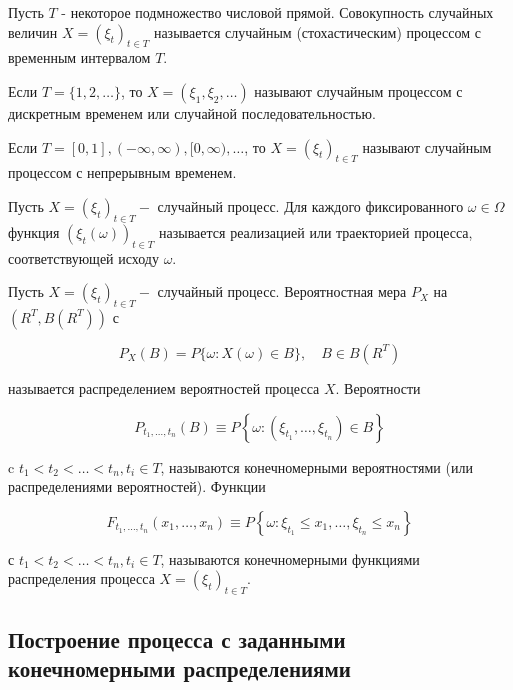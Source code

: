\begin{definition}\label{def_3_par_5}
 Пусть $T$ - некоторое подмножество числовой прямой. Совокупность случайных величин $X=\left(\xi_{t}\right)_{t \in T}$ называется случайным (стохастическим) процессом с временным интервалом $T$.

Если $T=\{1,2, \ldots\}$, то $X=\left(\xi_{1}, \xi_{2}, \ldots\right)$ называют случайным процессом с дискретным временем или случайной последовательностью.

Если $T=[0,1],(-\infty, \infty),[0, \infty), \ldots$, то $X=\left(\xi_{t}\right)_{t \in T}$ называют случайным процессом с непрерывным временем.
\end{definition}

\begin{definition} Пусть $X=\left(\xi_{t}\right)_{t \in T}-$ случайный процесс. Для каждого фиксированного $\omega \in \Omega$ функция $\left(\xi_{t}(\omega)\right)_{t \in T}$ называется реализацией или траекторией процесса, соответствующей исходу $\omega$.
\end{definition}

\begin{definition} Пусть $X=\left(\xi_{t}\right)_{t \in T}-$ случайный процесс. Вероятностная мера $P_{X}$ на $\left(R^{T}, {B}\left(R^{T}\right)\right)$ с

$$
P_{X}(B)={P}\{\omega: X(\omega) \in B\}, \quad B \in {B}\left(R^{T}\right)
$$

называется распределением вероятностей процесса $X$. Вероятности

$$
P_{t_{1}, \ldots, t_{n}}(B) \equiv {P}\left\{\omega:\left(\xi_{t_{1}}, \ldots, \xi_{t_{n}}\right) \in B\right\}
$$

c $t_{1}<t_{2}<\ldots<t_{n}, t_{i} \in T$, называются конечномерными вероятностями (или распределениями вероятностей). Функции

$$
F_{t_{1}, \ldots, t_{n}}\left(x_{1}, \ldots, x_{n}\right) \equiv {P}\left\{\omega: \xi_{t_{1}} \leqslant x_{1}, \ldots, \xi_{t_{n}} \leqslant x_{n}\right\}
$$

с $t_{1}<t_{2}<\ldots<t_{n}, t_{i} \in T$, называются конечномерными функциями распределения процесса $X=\left(\xi_{t}\right)_{t \in T}$.
\end{definition}

\subsection{Построение процесса с заданными конечномерными распределениями}
\label{par_9}

